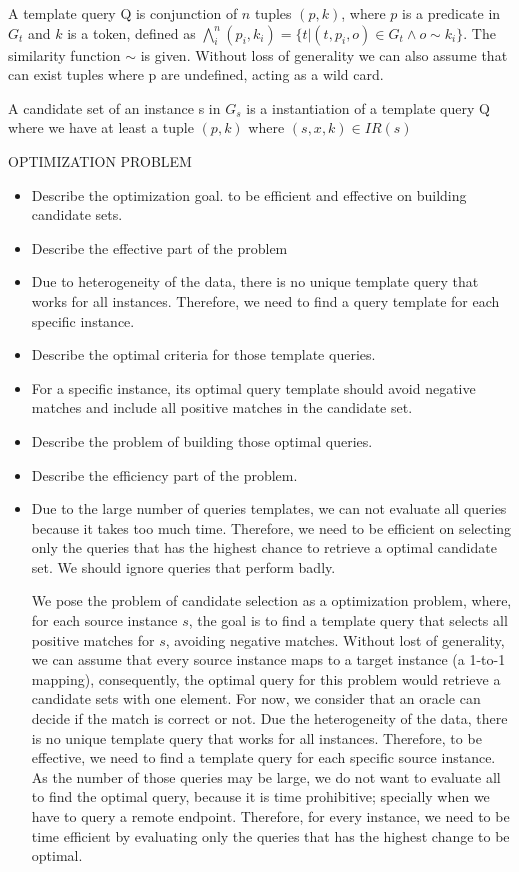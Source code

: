 \begin{definition}   A template query Q is conjunction of $n$ tuples $(p, k)$, where $p$ is a predicate in $G_t$ and $k$ is a token, defined as $ \bigwedge_{i}^n (p_i, k_i)=\{t | (t,p_i,o) \in G_t  \land o \sim k_i  \}$. The similarity function $\sim$ is given. Without loss of generality we can also assume that can exist tuples where p are undefined, acting as a wild card. 
\end{definition} 
 
\begin{definition}   A candidate set of an instance s in $G_s$ is a instantiation of a template query Q where we have at least a tuple $(p,k)$ where $(s,x,k) \in IR(s)$
\end{definition} 


OPTIMIZATION PROBLEM
\begin{itemize}
\item Describe the optimization goal. to be efficient and effective on building candidate sets.
\item Describe the effective part of the problem
\item Due to heterogeneity of the data, there is no unique template query that works for all instances. Therefore, we need to find a query template for each specific instance. 
\item Describe the optimal criteria for those template queries. 
\item For a specific instance, its optimal query template should avoid negative matches and include all positive matches in the candidate set. 
\item Describe the problem of building those optimal queries.
\item Describe the efficiency part of the problem. 
\item Due to the large number of queries templates, we can not evaluate all queries because it takes too much time. Therefore, we need to be efficient on selecting only the queries that has the highest chance to retrieve a optimal candidate set. We should ignore queries that perform badly.

We pose the problem of candidate selection as a optimization problem, where, for each source instance $s$, the goal is to find a template query that selects all positive matches for $s$, avoiding negative matches. Without lost of generality, we can assume that every source instance maps to a target instance (a 1-to-1 mapping), consequently, the optimal query for this problem would retrieve a candidate sets with one element. For now, we consider that an oracle can decide if the match is correct or not. Due the heterogeneity of the data, there is no unique template query that works for all instances. Therefore, to be effective, we need to find a template query for each specific source instance.  As the number of those queries may be large, we do not want to evaluate all to find the optimal query, because it is time prohibitive; specially when we have to query a remote endpoint. Therefore, for every instance, we need to be time efficient by evaluating only the queries that has the highest change to be optimal.
\end{itemize}



